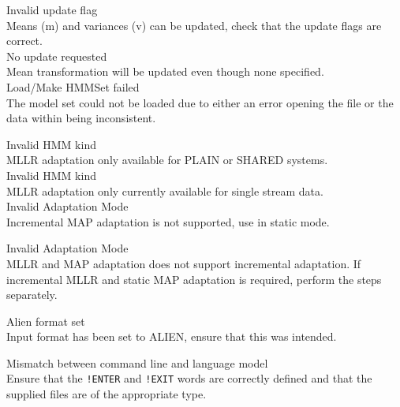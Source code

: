 \begin{itemize}

\begin{itemize}

 Invalid update flag\\      
        Means (m) and variances (v) can be updated, check that the update 
        flags are correct.\\

 No update requested\\
        Mean transformation will be updated even though none specified.\\

    Load/Make HMMSet failed\\
        The model set could not be loaded due to either an error opening the
        file or the data within being inconsistent.

 Invalid HMM kind\\
        MLLR adaptation only available for PLAIN or SHARED systems.\\

 Invalid HMM kind\\
        MLLR adaptation only currently available for single stream data.\\

 Invalid Adaptation Mode\\
        Incremental MAP adaptation is not supported, use in static
        mode.

 Invalid Adaptation Mode\\
        MLLR and MAP adaptation does not support incremental
        adaptation. If incremental MLLR and static MAP adaptation is 
        required, perform the steps separately.

 Alien format set\\
        Input format has been set to ALIEN, ensure that this was intended.\\

\end{itemize}


\begin{itemize}
 Mismatch between command line and language model\\
        Ensure that the \texttt{!ENTER} and \texttt{!EXIT} words are correctly 
        defined and that the supplied files are of the appropriate type.


\end{itemize}
\end{itemize}
